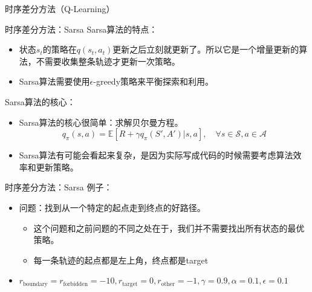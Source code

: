 \begin{section}{时序差分方法\alert{（Q-Learning）}}
\begin{frame}{时序差分方法：Sarsa}
    Sarsa算法的特点：
    \begin{itemize}
        \item 状态$s_t$的策略在$q(s_t,a_t)$更新之后立刻就更新了。所以它是一个增量更新的算法，不需要收集整条轨迹才更新一次策略。
        \item Sarsa算法需要使用$\epsilon$-greedy策略来平衡探索和利用。
    \end{itemize}
    Sarsa算法的核心：
    \begin{itemize}
        \item Sarsa算法的核心很简单：求解贝尔曼方程。
        \[
            q_\pi(s,a)=\mathbb{E}[R+\gamma q_\pi(S',A')|s,a], \quad \forall s\in\mathcal{S}, a\in\mathcal{A}
        \]
        \item Sarsa算法有可能会看起来复杂，是因为实际写成代码的时候需要考虑算法效率和更新策略。
    \end{itemize}
\end{frame}

\begin{frame}{时序差分方法：Sarsa}
    例子：
    \begin{itemize}
        \item 问题：找到从一个\alert{特定的起点}走到终点的好路径。
        \begin{itemize}
            \item 这个问题和之前问题的不同之处在于，我们并不需要找出\alert{所有状态的最优策略}。
            \item 每一条轨迹的起点都是左上角，终点都是target
        \end{itemize}
        \item $r_{\text{boundary}}=r_{\text{forbidden}}=-10, r_{\text{target}}=0, r_\text{other}=-1, \gamma=0.9, \alpha=0.1, \epsilon=0.1$
    \end{itemize}
\end{frame}


\end{section}
